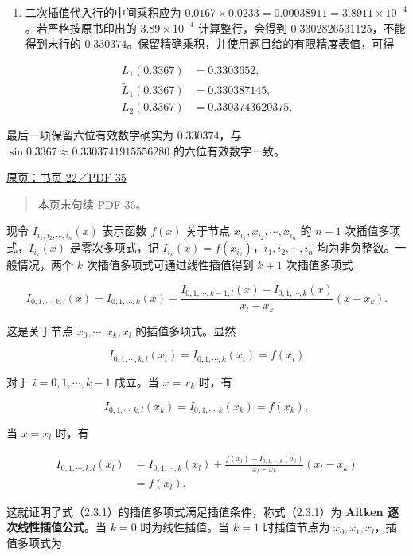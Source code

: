 \documentclass[
  10pt,
  fontset=fandol]{ctexart}
\providecommand{\tightlist}{%
  \setlength{\itemsep}{0pt}\setlength{\parskip}{0pt}}
\begin{document}
\begin{enumerate}
\def\labelenumi{\arabic{enumi}.}
\setcounter{enumi}{3}
\tightlist
\item
  二次插值代入行的中间乘积应为 \(0.0167\times0.0233=0.00038911=3.8911\times10^{-4}\)。若严格按原书印出的 \(3.89\times10^{-4}\) 计算整行，会得到 \(0.3302826531125\)，不能得到末行的 \(0.330374\)。保留精确乘积，并使用题目给的有限精度表值，可得
\end{enumerate}

\[
\begin{aligned}
L_1(0.3367)&=0.3303652,\\
\widetilde L_1(0.3367)&=0.330387145,\\
L_2(0.3367)&=0.3303743620375.
\end{aligned}
\]

最后一项保留六位有效数字确实为 \(0.330374\)，与 \(\sin0.3367\approx0.3303741915556280\) 的六位有效数字一致。

\href{../../source-images/pdf-035.jpeg}{原页：书页 22／PDF 35}

\begin{quote}
本页末句续 PDF 36。
\end{quote}

现令 \(I_{i_1,i_2,\cdots,i_n}(x)\) 表示函数 \(f(x)\) 关于节点 \(x_{i_1},x_{i_2},\cdots,x_{i_n}\) 的 \(n-1\) 次插值多项式，\(I_{i_k}(x)\) 是零次多项式，记 \(I_{i_k}(x)=f(x_{i_k})\)，\(i_1,i_2,\cdots,i_n\) 均为非负整数。一般情况，两个 \(k\) 次插值多项式可通过线性插值得到 \(k+1\) 次插值多项式

\[
I_{0,1,\cdots,k,l}(x)
=I_{0,1,\cdots,k}(x)
+\frac{I_{0,1,\cdots,k-1,l}(x)-I_{0,1,\cdots,k}(x)}
{x_l-x_k}(x-x_k).
\tag{2.3.1}
\]

这是关于节点 \(x_0,\cdots,x_k,x_l\) 的插值多项式。显然

\[
I_{0,1,\cdots,k,l}(x_i)=I_{0,1,\cdots,k}(x_i)=f(x_i)
\]

对于 \(i=0,1,\cdots,k-1\) 成立。当 \(x=x_k\) 时，有

\[
I_{0,1,\cdots,k,l}(x_k)=I_{0,1,\cdots,k}(x_k)=f(x_k),
\]

当 \(x=x_l\) 时，有

\[
\begin{aligned}
I_{0,1,\cdots,k,l}(x_l)
&=I_{0,1,\cdots,k}(x_l)
+\frac{f(x_l)-I_{0,1,\cdots,k}(x_l)}{x_l-x_k}(x_l-x_k)\\
&=f(x_l).
\end{aligned}
\]

这就证明了式（2.3.1）的插值多项式满足插值条件，称式（2.3.1）为 \textbf{Aitken 逐次线性插值公式}。当 \(k=0\) 时为线性插值。当 \(k=1\) 时插值节点为 \(x_0,x_1,x_l\)，插值多项式为
\end{document}
